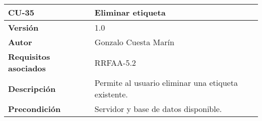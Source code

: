\begin{longtable}[]{@{}ll@{}}
\toprule
\begin{minipage}[b]{0.22\columnwidth}\raggedright
\textbf{CU-35}\strut
\end{minipage} & \begin{minipage}[b]{0.72\columnwidth}\raggedright
\textbf{Eliminar etiqueta}\strut
\end{minipage}\tabularnewline
\midrule
\endhead
\begin{minipage}[t]{0.22\columnwidth}\raggedright
\textbf{Versión}\strut
\end{minipage} & \begin{minipage}[t]{0.72\columnwidth}\raggedright
1.0\strut
\end{minipage}\tabularnewline
\begin{minipage}[t]{0.22\columnwidth}\raggedright
\textbf{Autor}\strut
\end{minipage} & \begin{minipage}[t]{0.72\columnwidth}\raggedright
Gonzalo Cuesta Marín\strut
\end{minipage}\tabularnewline
\begin{minipage}[t]{0.22\columnwidth}\raggedright
\textbf{Requisitos asociados}\strut
\end{minipage} & \begin{minipage}[t]{0.72\columnwidth}\raggedright
RRFAA-5.2\strut
\end{minipage}\tabularnewline
\begin{minipage}[t]{0.22\columnwidth}\raggedright
\textbf{Descripción}\strut
\end{minipage} & \begin{minipage}[t]{0.72\columnwidth}\raggedright
Permite al usuario eliminar una etiqueta existente.\strut
\end{minipage}\tabularnewline
\begin{minipage}[t]{0.22\columnwidth}\raggedright
\textbf{Precondición}\strut
\end{minipage} & \begin{minipage}[t]{0.72\columnwidth}\raggedright
Servidor y base de datos disponible.


\end{minipage}
\end{longtable}
